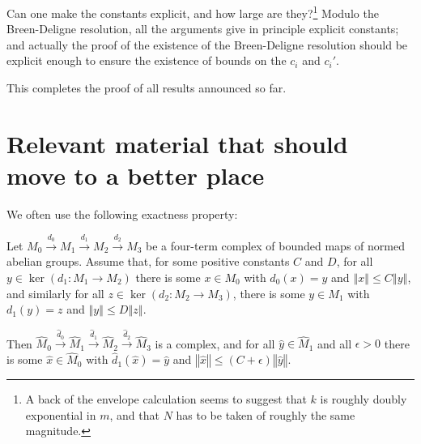 \begin{question} Can one make the constants explicit, and how large are they?\footnote{A back of the envelope calculation seems to suggest that $k$ is roughly doubly exponential in $m$, and that $N$ has to be taken of roughly the same magnitude.} Modulo the Breen-Deligne resolution, all the arguments give in principle explicit constants; and actually the proof of the existence of the Breen-Deligne resolution should be explicit enough to ensure the existence of bounds on the $c_i$ and $c_i'$.
\end{question}

This completes the proof of all results announced so far.

\section{Relevant material that should move to a better place}

We often use the following exactness property:

\begin{proposition}\label{prop:completeexact}
Let $M_0\xrightarrow{d_0} M_1\xrightarrow{d_1} M_2\xrightarrow{d_2} M_3$ be a
four-term complex of bounded maps of normed abelian groups. Assume that, for
some positive constants $C$ and $D$, for all $y\in \ker(d_1: M_1\to M_2)$ there
is some $x\in M_0$ with $d_0(x)=y$ and $‖x‖\leq C‖y‖$, and similarly for all
$z\in \ker(d_2: M_2\to M_3)$, there is some $y\in M_1$ with $d_1(y)=z$ and
$‖y‖\leq D‖z‖$.

Then
$\widehat{M}_0\xrightarrow{\widehat{d}_0} \widehat{M}_1\xrightarrow{\widehat{d}_1} \widehat{M}_2\xrightarrow{\widehat{d}_2} \widehat{M}_3$
is a complex, and for all $\widehat{y}\in \widehat{M}_1$ and all $\epsilon>0$
there is some $\widehat{x}\in \widehat{M}_0$ with
$\widehat{d}_1(\widehat{x})=\widehat{y}$ and
$‖\widehat{x}‖\leq (C+\epsilon)‖\widehat{y}‖$.
\end{proposition}

